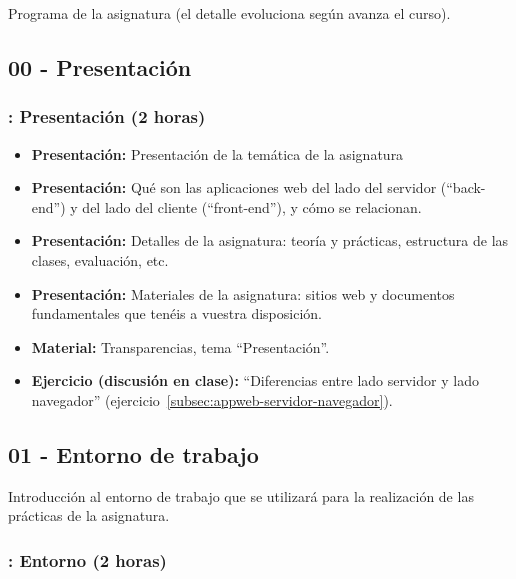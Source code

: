 \documentclass[a4paper,12pt]{article}
\begin{document}
Programa de la asignatura (el detalle evoluciona según avanza el curso).

\subsection{00 - Presentación}

\subsubsection{\lunesA: Presentación  (2 horas)}
\label{cal:lunesA}

\begin{itemize}
\item \textbf{Presentación:} Presentación de la temática de la asignatura
\item \textbf{Presentación:} Qué son las aplicaciones web del lado del servidor (``back-end'') y del lado del cliente (``front-end''), y cómo se relacionan.
\item \textbf{Presentación:} Detalles de la asignatura: teoría y prácticas, estructura de las clases, evaluación, etc.
\item \textbf{Presentación:} Materiales de la asignatura: sitios web y documentos fundamentales que tenéis a vuestra disposición.
\item \textbf{Material:} Transparencias, tema ``Presentación''.
\item \textbf{Ejercicio (discusión en clase):} ``Diferencias entre lado servidor y lado navegador'' (ejercicio~\ref{subsec:appweb-servidor-navegador}).
\end{itemize}

\subsection{01 - Entorno de trabajo}

Introducción al entorno de trabajo que se utilizará para la realización de las prácticas de la asignatura.

\subsubsection{\martesA: Entorno  (2 horas)}
\label{cal:martesA}
\end{document}
